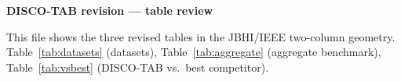 \documentclass[journal,twoside,web]{ieeecolor}
\begin{document}
\noindent\textbf{\large DISCO-TAB revision --- table review}\par\medskip
\noindent This file shows the three revised tables in the JBHI/IEEE two-column
geometry. Table~\ref{tab:datasets} (datasets), Table~\ref{tab:aggregate}
(aggregate benchmark), Table~\ref{tab:vsbest} (DISCO-TAB vs.\ best competitor).
\clearpage

\clearpage

\clearpage

\clearpage

\end{document}
